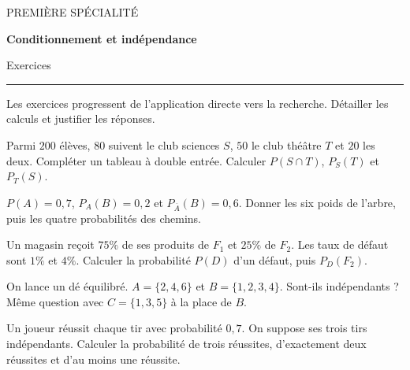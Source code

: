 \documentclass[11pt,a4paper]{article}
\begin{document}
{\small\color{Blue}PREMIÈRE SPÉCIALITÉ}\par{\LARGE\bfseries Conditionnement et indépendance}\par{\large Exercices}\par\vspace{0.2cm}\hrule\vspace{0.4cm}
Les exercices progressent de l’application directe vers la recherche. Détailler les calculs et justifier les réponses.
\par\noindent\begin{minipage}{\linewidth}
Parmi $200$ élèves, $80$ suivent le club sciences $S$, $50$ le club théâtre $T$ et $20$ les deux. Compléter un tableau à double entrée. Calculer $P(S\cap T)$, $P_S(T)$ et $P_T(S)$.
\end{minipage}\par
\par\noindent\begin{minipage}{\linewidth}
$P(A)=0,7$, $P_A(B)=0,2$ et $P_{\overline A}(B)=0,6$. Donner les six poids de l’arbre, puis les quatre probabilités des chemins.
\end{minipage}\par
\par\noindent\begin{minipage}{\linewidth}
Un magasin reçoit $75\%$ de ses produits de $F_1$ et $25\%$ de $F_2$. Les taux de défaut sont $1\%$ et $4\%$. Calculer la probabilité $P(D)$ d’un défaut, puis $P_D(F_2)$.
\end{minipage}\par
\par\noindent\begin{minipage}{\linewidth}
On lance un dé équilibré. $A=\{2,4,6\}$ et $B=\{1,2,3,4\}$. Sont-ils indépendants ? Même question avec $C=\{1,3,5\}$ à la place de $B$.
\end{minipage}\par
\par\noindent\begin{minipage}{\linewidth}
Un joueur réussit chaque tir avec probabilité $0,7$. On suppose ses trois tirs indépendants. Calculer la probabilité de trois réussites, d’exactement deux réussites et d’au moins une réussite.
\end{minipage}\par
\end{document}
